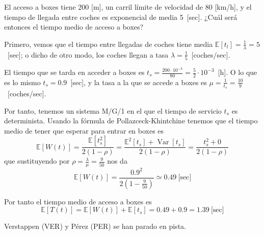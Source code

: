 \documentclass{upmassignment}
\DeclareMathOperator{\Var}{Var}
\begin{document}
\begin{problemlist}
    \pbitem El acceso a boxes tiene
    200 [m], un carril
    límite de velocidad de
    80 [km/h], y el tiempo de llegada
    entre coches es exponencial de media
    5~[sec]. ¿Cuál será entonces el tiempo
    medio de acceso a boxes?

    \begin{solucion}
        Primero, vemos que el tiempo entre llegadas
de coches
tiene media $\mathbb{E}[t_l]=\tfrac{1}{\lambda}=5$~[sec];
o dicho de otro modo, los coches llegan
a tasa $\lambda=\tfrac{1}{5}$~[coches/sec].

El tiempo que se tarda en acceder a boxes es
$t_s=\tfrac{200\cdot10^{-3}}{80}=\tfrac{5}{2}\cdot10^{-3}$~[h].
O lo que es lo mismo
$t_s=0.9$~[sec], y la tasa a la que
se accede a boxes es
$\mu=\tfrac{1}{t_s}=\tfrac{10}{9}$~[coches/sec].

Por tanto, tenemos un sistema M/G/1 en el que
el tiempo de servicio $t_s$ es determinista.
Usando la fórmula de Pollazceck-Khintchine
tenemos que el tiempo medio de tener que
esperar para entrar en boxes es
\begin{equation*}
    \mathbb{E}[W(t)]
    =\frac{\mathbb{E}[t_s^2]}{2(1-\rho)}
    =\frac{\mathbb{E}^2[t_s]+\Var[t_s]}{2(1-\rho)}
    =\frac{t_s^2+0}{2(1-\rho)}
\end{equation*}
que sustituyendo por
$\rho=\tfrac{\lambda}{\mu}=\tfrac{9}{50}$
nos da
\begin{equation*}
    \mathbb{E}[W(t)]=
    \frac{0.9^2}{2\left(1-\frac{9}{50}\right)}
    \simeq0.49~\text{[sec]}
\end{equation*}

Por tanto el tiempo medio de acceso a boxes es
\begin{equation*}
    \mathbb{E}[T(t)] = \mathbb{E}[W(t)]+
    \mathbb{E}[t_s]
    = 0.49 + 0.9 = 1.39~\text{[sec]}
\end{equation*}



    \end{solucion}


    \pbitem Verstappen (VER)
    y Pérez (PER) se han parado en pista.

    \vspace{1em}
\end{problemlist}
\end{document}
